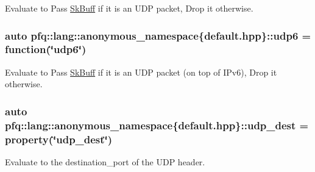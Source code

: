 Evaluate to {\ttfamily Pass} \hyperlink{structpfq_1_1lang_1_1SkBuff}{Sk\+Buff} if it is an U\+DP packet, {\ttfamily Drop} it otherwise. 

\subsubsection[{\texorpdfstring{udp6}{udp6}}]{\setlength{\rightskip}{0pt plus 5cm}auto pfq\+::lang\+::anonymous\+\_\+namespace\{default.\+hpp\}\+::udp6 = {\bf function}(\char`\"{}udp6\char`\"{})}\hypertarget{namespacepfq_1_1lang_1_1anonymous__namespace_02default_8hpp_03_a37f7f4eb5cff8508b956eba7dee75a45}{}\label{namespacepfq_1_1lang_1_1anonymous__namespace_02default_8hpp_03_a37f7f4eb5cff8508b956eba7dee75a45}


Evaluate to {\ttfamily Pass} \hyperlink{structpfq_1_1lang_1_1SkBuff}{Sk\+Buff} if it is an U\+DP packet (on top of I\+Pv6), {\ttfamily Drop} it otherwise. 

\subsubsection[{\texorpdfstring{udp\+\_\+dest}{udp_dest}}]{\setlength{\rightskip}{0pt plus 5cm}auto pfq\+::lang\+::anonymous\+\_\+namespace\{default.\+hpp\}\+::udp\+\_\+dest = {\bf property}(\char`\"{}udp\+\_\+dest\char`\"{})}\hypertarget{namespacepfq_1_1lang_1_1anonymous__namespace_02default_8hpp_03_a7c15d9ec0af24b9515acc8a04b7b1e2e}{}\label{namespacepfq_1_1lang_1_1anonymous__namespace_02default_8hpp_03_a7c15d9ec0af24b9515acc8a04b7b1e2e}


Evaluate to the {\ttfamily destination\+\_\+port} of the U\+DP header. 

